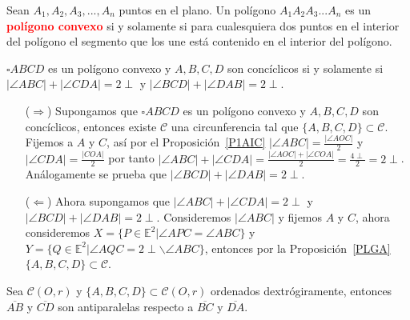 \begin{df}
Sean $A_{1},A_{2},A_{3},...,A_{n}$ puntos en el plano. Un polígono $A_{1}A_{2}A_{3}...A_{n}$
es un \textcolor{red}{\bf polígono convexo} si y solamente si para cualesquiera dos puntos en el interior del polígono el segmento que los une está contenido en el interior del polígono. 
\end{df}
\begin{prop}
$\square ABCD$ es un polígono convexo y $A,B,C,D$ son concíclicos si y solamente si $|\angle ABC|+|\angle CDA|=2\perp$ y $|\angle BCD|+|\angle DAB|=2\perp$.
\end{prop}
\begin{pba}
\begin{enumerate}
\item [($\Rightarrow$)] Supongamos que $\square ABCD$ es un polígono convexo y $A,B,C,D$ son concíclicos, entonces existe $\mathcal{C}$ una circunferencia tal que $\{A,B,C,D\}\subset\mathcal{C}$. 
Fijemos a $A$ y $C$, así por el Proposición~\ref{P1AIC} $|\angle ABC|=\frac{|\angle AOC|}{2}$ y $|\angle CDA|=\frac{|COA|}{2}$ por tanto $|\angle ABC|+|\angle CDA|=\frac{|\angle AOC|+|\angle COA|}{2}=\frac{4\perp}{2}=2\perp$. 
Análogamente se prueba que $|\angle BCD|+|\angle DAB|=2\perp$.
\item [($\Leftarrow$)] Ahora supongamos que $|\angle ABC|+|\angle CDA|=2\perp$ y $|\angle BCD|+|\angle DAB|=2\perp$. Consideremos $|\angle ABC|$ y fijemos $A$ y $C$, ahora consideremos $X=\{P\in\mathbb{E}^{2}|\angle APC=\angle ABC\}$ y $Y=\{Q\in\mathbb{E}^{2}|\angle AQC=2\perp\backslash\angle ABC\}$, entonces por la Proposición~\ref{PLGA} $\{A,B,C,D\}\subset\mathcal{C}$.
\end{enumerate}
\end{pba}
\begin{prop}
Sea $\mathcal{C}(O,r)$ y $\{A,B,C,D\}\subset\mathcal{C}(O,r)$ ordenados dextrógiramente, entonces $\overline{AB}$ y $\overline{CD}$ son antiparalelas respecto a $\overline{BC}$ y $\overline{DA}$.
\end{prop}
